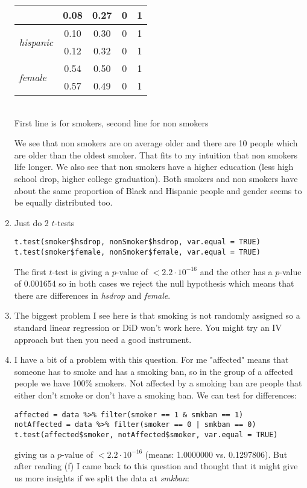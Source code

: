 \documentclass{article}
\begin{document}
\begin{enumerate}[label=(\alph*)]
\begin{center}
\begin{tabular}{l|cccc}
				 & 0.08 & 0.27 & 0 & 1 \\
				\hline
				\multirow{2}{1.5cm}{\textit{hispanic}} & 0.10 & 0.30 & 0 & 1 \\
				 & 0.12 & 0.32 & 0 & 1 \\
				\hline
				\multirow{2}{1.5cm}{\textit{female}} & 0.54 & 0.50 & 0 & 1 \\
				 & 0.57 & 0.49 & 0 & 1 \\
			\end{tabular} \\
			First line is for smokers, second line for non smokers
		\end{center}
		We see that non smokers are on average older and there are 10 people which are older than the oldest smoker. That fits to my intuition that non smokers life longer. We also see that non smokers have a higher education (less high school drop, higher college graduation). Both smokers and non smokers have about the same proportion of Black and Hispanic people and gender seems to be equally distributed too.
		\item Just do 2 $t$-tests
		\begin{lstlisting}
t.test(smoker$hsdrop, nonSmoker$hsdrop, var.equal = TRUE)
t.test(smoker$female, nonSmoker$female, var.equal = TRUE)
		\end{lstlisting}
		The first $t$-test is giving a $p$-value of $<2.2\cdot 10^{-16}$ and the other has a $p$-value of 0.001654 so in both cases we reject the null hypothesis which means that there are differences in \textit{hsdrop} and \textit{female}.
		\item The biggest problem I see here is that smoking is not randomly assigned so a standard linear regression or DiD won't work here. You might try an IV approach but then you need a good instrument. %
		\item I have a bit of a problem with this question. For me "affected" means that someone has to smoke and has a smoking ban, so in the group of a affected people we have 100\% smokers. Not affected by a smoking ban are people that either don't smoke or don't have a smoking ban. We can test for differences:
		\begin{lstlisting}
affected = data %>% filter(smoker == 1 & smkban == 1)
notAffected = data %>% filter(smoker == 0 | smkban == 0)
t.test(affected$smoker, notAffected$smoker, var.equal = TRUE)
		\end{lstlisting}
		giving us a $p$-value of  $<2.2\cdot 10^{-16}$ (means: 1.0000000 vs. 0.1297806). But after reading (f) I came back to this question and thought that it might give us more insights if we split the data at \textit{smkban}:

\end{enumerate}
\end{document}
